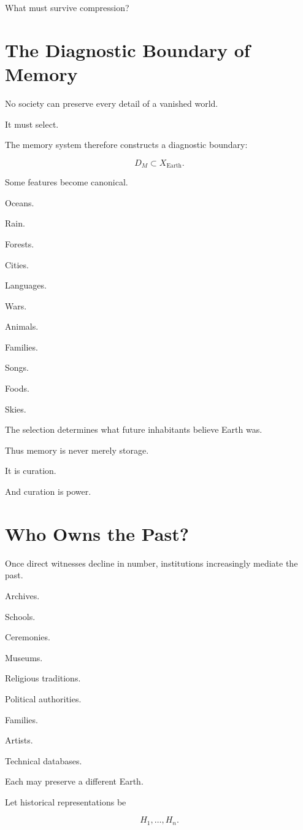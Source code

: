 \documentclass[11pt,oneside]{book}
\theoremstyle{definition}
\theoremstyle{remark}
\begin{document}
What must survive compression?

\section{The Diagnostic Boundary of Memory}

No society can preserve every detail of a vanished world.

It must select.

The memory system therefore constructs a diagnostic boundary:

\[
D_M
\subset
X_{\mathrm{Earth}}.
\]

Some features become canonical.

Oceans.

Rain.

Forests.

Cities.

Languages.

Wars.

Animals.

Families.

Songs.

Foods.

Skies.

The selection determines what future inhabitants believe Earth was.

Thus memory is never merely storage.

It is curation.

And curation is power.

\section{Who Owns the Past?}

Once direct witnesses decline in number, institutions increasingly mediate the past.

Archives.

Schools.

Ceremonies.

Museums.

Religious traditions.

Political authorities.

Families.

Artists.

Technical databases.

Each may preserve a different Earth.

Let historical representations be

\[
H_1,\ldots,H_n.
\]
\end{document}
